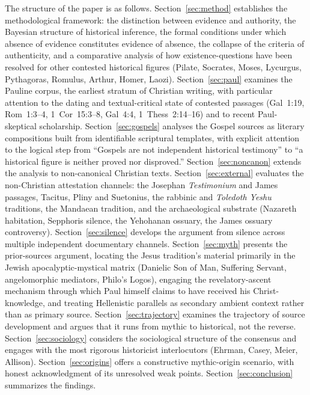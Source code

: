 \documentclass[12pt,oneside]{article}
\begin{document}
The structure of the paper is as follows.  Section~\ref{sec:method}
establishes the methodological framework: the distinction between
evidence and authority, the Bayesian structure of historical
inference, the formal conditions under which absence of evidence
constitutes evidence of absence, the collapse of the criteria of
authenticity, and a comparative analysis of how existence-questions
have been resolved for other contested historical figures
(Pilate, Socrates, Moses, Lycurgus, Pythagoras, Romulus, Arthur,
Homer, Laozi).  Section~\ref{sec:paul} examines the Pauline corpus,
the earliest stratum of Christian writing, with particular attention
to the dating and textual-critical state of contested passages
(Gal~1:19, Rom~1:3--4, 1~Cor~15:3--8, Gal~4:4, 1~Thess~2:14--16)
and to recent Paul-skeptical scholarship.
Section~\ref{sec:gospels} analyses the Gospel sources as literary
compositions built from identifiable scriptural templates, with
explicit attention to the logical step from ``Gospels are not
independent historical testimony'' to ``a historical figure is
neither proved nor disproved.''  Section~\ref{sec:noncanon}
extends the analysis to non-canonical Christian texts.
Section~\ref{sec:external} evaluates the non-Christian attestation
channels: the Josephan \textit{Testimonium} and James passages,
Tacitus, Pliny and Suetonius, the rabbinic and \textit{Toledoth
Yeshu} traditions, the Mandaean tradition, and the archaeological
substrate (Nazareth habitation, Sepphoris silence, the Yehohanan
ossuary, the James ossuary controversy).
Section~\ref{sec:silence} develops the argument from silence across
multiple independent documentary channels.  Section~\ref{sec:myth}
presents the prior-sources argument, locating the Jesus tradition's
material primarily in the Jewish apocalyptic-mystical matrix
(Danielic Son of Man, Suffering Servant, angelomorphic mediators,
Philo's Logos), engaging the revelatory-ascent mechanism through
which Paul himself claims to have received his Christ-knowledge,
and treating Hellenistic parallels as secondary ambient context
rather than as primary source.  Section~\ref{sec:trajectory}
examines the trajectory of source development and argues that it
runs from mythic to historical, not the reverse.
Section~\ref{sec:sociology} considers the sociological structure of
the consensus and engages with the most rigorous historicist
interlocutors (Ehrman, Casey, Meier, Allison).
Section~\ref{sec:origins} offers a constructive mythic-origin
scenario, with honest acknowledgment of its unresolved weak points.
Section~\ref{sec:conclusion} summarizes the findings.
\end{document}
